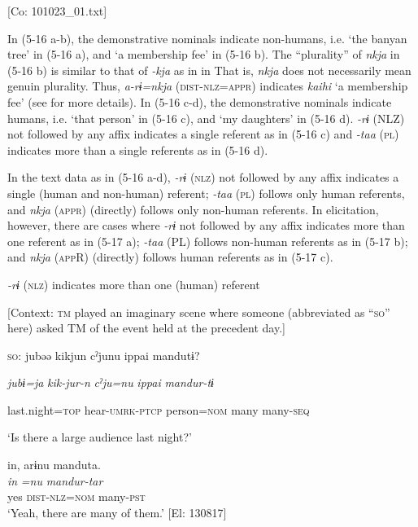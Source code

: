     [Co: 101023\_01.txt]
    \z
\z

In (5-16 a-b), the demonstrative nominals indicate non-humans, i.e. ‘the banyan tree’ in (5-16 a), and ‘a membership fee’ in (5-16 b). The “plurality” of \textit{nkja} in (5-16 b) is similar to that of \textit{{}-kja} as in  in  That is, \textit{nkja} does not necessarily mean genuin plurality. Thus, \textit{a-rɨ=nkja} (\textsc{dist}-\textsc{nlz}=\textsc{appr}) indicates \textit{kaihi} ‘a membership fee’ (see  for more details). In (5-16 c-d), the demonstrative nominals indicate humans, i.e. ‘that person’ in (5-16 c), and ‘my daughters’ in (5-16 d). \textit{{}-rɨ} (NLZ) not followed by any affix indicates a single referent as in (5-16 c) and \textit{{}-taa} (\textsc{pl}) indicates more than a single referents as in (5-16 d).

  In the text data as in (5-16 a-d), \textit{{}-rɨ} (\textsc{nlz}) not followed by any affix indicates a single (human and non-human) referent; \textit{{}-taa} (\textsc{pl}) follows only human referents, and \textit{nkja} (\textsc{appr}) (directly) follows only non-human referents. In elicitation, however, there are cases where \textit{{}-rɨ} not followed by any affix indicates more than one referent as in (5-17 a); \textit{{}-taa} (PL) follows non-human referents as in (5-17 b); and \textit{nkja} (\textsc{app}R) (directly) follows human referents as in (5-17 c).

\ea \label{ex:5:17}  \ea \label{ex:5:17a} \textit{{}-rɨ} (\textsc{nlz}) indicates more than one (human) referent

    [Context: \textsc{tm} played an imaginary scene where someone (abbreviated as “\textsc{so}” here) asked TM of the event held at the precedent day.]

    \textsc{so}:  jubəə  kikjun  cˀjunu  ippai  mandutɨ?

      \textit{jubɨ=ja}  \textit{kik-jur-n}  \textit{cˀju=nu}  \textit{ippai}  \textit{mandur-tɨ}

      last.night=\textsc{top}  hear-\textsc{umrk}-\textsc{ptcp}  person=\textsc{nom}  many  many-\textsc{seq}

      ‘Is there a large audience last night?’

\glll  in,  arɨnu  manduta.\\
\textit{in}  \textit{=nu}  \textit{mandur-tar}\\
yes  \textsc{dist}-\textsc{nlz}=\textsc{nom}  many-\textsc{pst}\\
\glt ‘Yeah, there are many of them.’ [El: 130817]

